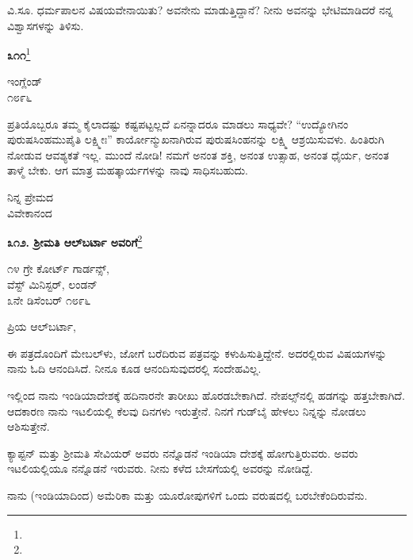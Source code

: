 ವಿ.ಸೂ.\enginline{-} ಧರ್ಮಪಾಲನ ವಿಷಯವೇನಾಯಿತು? ಅವನೇನು ಮಾಡುತ್ತಿದ್ದಾನೆ? ನೀನು ಅವನನ್ನು ಭೇಟಿಮಾಡಿದರೆ ನನ್ನ ವಿಶ್ವಾಸಗಳನ್ನು ತಿಳಿಸು.

\begin{center}
\textbf{೩೧೧}\footnote{}
\end{center}

\begin{flushright}
ಇಂಗ್ಲೆಂಡ್\\೧೮೯೬
\end{flushright}

ಪ್ರತಿಯೊಬ್ಬರೂ ತಮ್ಮ ಕೈಲಾದಷ್ಟು ಕಷ್ಟಪಟ್ಟಲ್ಲದೆ ಏನನ್ನಾದರೂ ಮಾಡಲು ಸಾಧ್ಯವೇ? “ಉದ್ಯೋಗಿನಂ ಪುರುಷಸಿಂಹಮುಪೈತಿ ಲಕ್ಷ್ಮೀಃ” ಕಾರ್ಯೋನ್ಮುಖನಾಗಿರುವ ಪುರುಷಸಿಂಹನನ್ನು ಲಕ್ಷ್ಮಿ ಆಶ್ರಯಿಸುವಳು. ಹಿಂತಿರುಗಿ ನೋಡುವ ಆವಶ್ಯಕತೆ ಇಲ್ಲ. ಮುಂದೆ ನೋಡಿ! ನಮಗೆ ಅನಂತ ಶಕ್ತಿ, ಅನಂತ ಉತ್ಸಾಹ, ಅನಂತ ಧೈರ್ಯ, ಅನಂತ ತಾಳ್ಮೆ ಬೇಕು. ಆಗ ಮಾತ್ರ ಮಹತ್ಕಾರ್ಯಗಳನ್ನು ನಾವು ಸಾಧಿಸಬಹುದು.

{\flushright
ನಿನ್ನ ಪ್ರೇಮದ\\ವಿವೇಕಾನಂದ\par}

\newpage

\begin{center}
\textbf{೩೧೨. ಶ‍್ರೀಮತಿ ಆಲ್‌ಬರ್ಟಾ ಅವರಿಗೆ}\footnote{}
\end{center}

\vspace{-0.5cm}

\begin{flushright}
೧೪ ಗ್ರೇ ಕೋರ್ಟ್ ಗಾರ್ಡನ್ಸ್,\\ವೆಸ್ಟ್ ಮಿನಿಸ್ಟರ್,  ಲಂಡನ್\\೩ನೇ ಡಿಸೆಂಬರ್ ೧೮೯೬
\end{flushright}

\vspace{-0.3cm}

\noindent
ಪ್ರಿಯ ಆಲ್‌ಬರ್ಟಾ,

ಈ ಪತ್ರದೊಂದಿಗೆ ಮೇಬಲ್‌ಳು, ಜೋಗೆ ಬರೆದಿರುವ ಪತ್ರವನ್ನು ಕಳುಹಿಸುತ್ತಿದ್ದೇನೆ. ಅದರಲ್ಲಿರುವ ವಿಷಯಗಳನ್ನು ನಾನು ಓದಿ ಆನಂದಿಸಿದೆ. ನೀನೂ ಕೂಡ ಆನಂದಿಸುವುದರಲ್ಲಿ ಸಂದೇಹವಿಲ್ಲ.

ಇಲ್ಲಿಂದ ನಾನು ಇಂಡಿಯಾದೇಶಕ್ಕೆ ಹದಿನಾರನೇ ತಾರೀಖು ಹೊರಡಬೇಕಾಗಿದೆ. ನೇಪಲ್ಸ್‌ನಲ್ಲಿ ಹಡಗನ್ನು ಹತ್ತಬೇಕಾಗಿದೆ. ಆದಕಾರಣ ನಾನು ಇಟಲಿಯಲ್ಲಿ ಕೆಲವು ದಿನಗಳು ಇರುತ್ತೇನೆ. ನಿನಗೆ ಗುಡ್‌ಬೈ ಹೇಳಲು ನಿನ್ನನ್ನು ನೋಡಲು ಆಶಿಸುತ್ತೇನೆ.

ಕ್ಯಾಪ್ಟನ್ ಮತ್ತು ಶ‍್ರೀಮತಿ ಸೇವಿಯರ್ ಅವರು ನನ್ನೊಡನೆ ಇಂಡಿಯಾ ದೇಶಕ್ಕೆ ಹೋಗುತ್ತಿರುವರು. ಅವರು ಇಟಲಿಯಲ್ಲಿಯೂ ನನ್ನೊಡನೆ ಇರುವರು. ನೀನು ಕಳೆದ ಬೇಸಗೆಯಲ್ಲಿ ಅವರನ್ನು ನೋಡಿದ್ದೆ.

ನಾನು (ಇಂಡಿಯಾದಿಂದ) ಅಮೆರಿಕಾ ಮತ್ತು ಯೂರೋಪುಗಳಿಗೆ ಒಂದು ವರುಷದಲ್ಲಿ ಬರಬೇಕೆಂದಿರುವೆನು.

